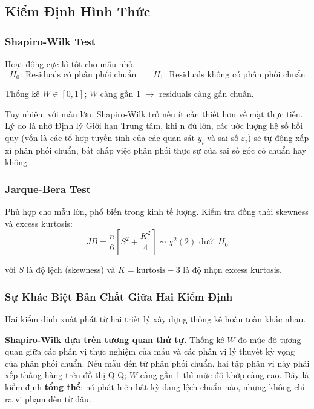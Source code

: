 \documentclass[12pt, a4paper]{article}
\begin{document}
\subsection{Kiểm Định Hình Thức}

\subsubsection{Shapiro-Wilk Test}

Hoạt động cực kì tốt cho mẫu nhỏ.
\[
  H_0{:}\ \text{Residuals có phân phối chuẩn}
  \qquad
  H_1{:}\ \text{Residuals không có phân phối chuẩn}
\]

Thống kê $W \in [0,1]$; $W$ càng gần 1 $\to$ residuals càng gần chuẩn.


Tuy nhiên, với mẫu lớn, Shapiro-Wilk trở nên ít cần thiết hơn về mặt thực tiễn. Lý do là nhờ 
Định lý Giới hạn Trung tâm, khi n đủ lớn, các ước lượng hệ số hồi quy 
(vốn là các tổ hợp tuyến tính của các quan sát $y_i$ và sai số $\varepsilon_i$) sẽ tự động xấp xỉ phân phối chuẩn, 
bất chấp việc phân phối thực sự của sai số gốc có chuẩn hay không


\subsubsection{Jarque-Bera Test}

Phù hợp cho mẫu lớn, phổ biến trong kinh tế lượng. Kiểm tra đồng thời skewness và excess kurtosis:
\[
  JB = \frac{n}{6}\!\left[S^2 + \frac{K^2}{4}\right] \sim \chi^2(2) \text{ dưới } H_0
\]

với $S$ là độ lệch (skewness) và $K = \text{kurtosis} - 3$ là độ nhọn excess kurtosis.

\subsubsection{Sự Khác Biệt Bản Chất Giữa Hai Kiểm Định}

Hai kiểm định xuất phát từ hai triết lý xây dựng thống kê hoàn toàn khác nhau.

\textbf{Shapiro-Wilk dựa trên tương quan thứ tự.} Thống kê $W$ đo mức độ tương quan giữa các phân vị thực nghiệm của mẫu và các phân vị lý thuyết kỳ vọng của phân phối chuẩn. Nếu mẫu đến từ phân phối chuẩn, hai tập phân vị này phải xếp thẳng hàng trên đồ thị Q-Q; $W$ càng gần 1 thì mức độ khớp càng cao. Đây là kiểm định \textbf{tổng thể}: nó phát hiện bất kỳ dạng lệch chuẩn nào, nhưng không chỉ ra vi phạm đến từ đâu.
\end{document}
